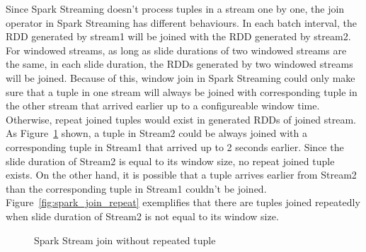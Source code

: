 Since Spark Streaming doesn't process tuples in a stream one by one, the join operator in Spark Streaming has different behaviours. In each batch interval, the RDD generated by stream1 will be joined with the RDD generated by stream2. For windowed streams, as long as slide durations of two windowed streams are the same, in each slide duration, the RDDs generated by two windowed streams will be joined. Because of this, window join in Spark Streaming could only make sure that a tuple in one stream will always be joined with corresponding tuple in the other stream that arrived earlier up to a configureable window time. Otherwise, repeat joined tuples would exist in generated RDDs of joined stream. As Figure~\ref{fig:spark_join_norepeat} shown, a tuple in Stream2 could be always joined with a corresponding tuple in Stream1 that arrived up to 2 seconds earlier. Since the slide duration of Stream2 is equal to its window size, no repeat joined tuple exists. On the other hand, it is possible that a tuple arrives earlier from Stream2 than the corresponding tuple in Stream1 couldn't be joined. Figure~\ref{fig:spark_join_repeat} exemplifies that there are tuples joined repeatedly  when slide duration of Stream2 is not equal to its window size.

\begin{figure}
  \begin{center}
   \caption{Spark Stream join without repeated tuple}
   \label{fig:spark_join_norepeat}
  \end{center}
\end{figure}

